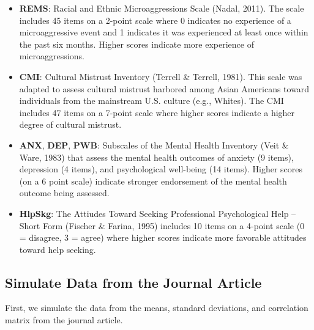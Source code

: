 \documentclass[
  11pt,
]{book}
\providecommand{\tightlist}{%
  \setlength{\itemsep}{0pt}\setlength{\parskip}{0pt}}
\begin{document}
\begin{itemize}
\tightlist
\item
  \textbf{REMS}: Racial and Ethnic Microaggressions Scale (Nadal, 2011). The scale includes 45 items on a 2-point scale where 0 indicates no experience of a microaggressive event and 1 indicates it was experienced at least once within the past six months. Higher scores indicate more experience of microaggressions.
\item
  \textbf{CMI}: Cultural Mistrust Inventory (Terrell \& Terrell, 1981). This scale was adapted to assess cultural mistrust harbored among Asian Americans toward individuals from the mainstream U.S. culture (e.g., Whites). The CMI includes 47 items on a 7-point scale where higher scores indicate a higher degree of cultural mistrust.
\item
  \textbf{ANX}, \textbf{DEP}, \textbf{PWB}: Subscales of the Mental Health Inventory (Veit \& Ware, 1983) that assess the mental health outcomes of anxiety (9 items), depression (4 items), and psychological well-being (14 items). Higher scores (on a 6 point scale) indicate stronger endorsement of the mental health outcome being assessed.
\item
  \textbf{HlpSkg}: The Attiudes Toward Seeking Professional Psychological Help -- Short Form (Fischer \& Farina, 1995) includes 10 items on a 4-point scale (0 = disagree, 3 = agree) where higher scores indicate more favorable attitudes toward help seeking.
\end{itemize}

\hypertarget{simulate-data-from-the-journal-article-1}{%
\subsection{Simulate Data from the Journal Article}\label{simulate-data-from-the-journal-article-1}}

First, we simulate the data from the means, standard deviations, and correlation matrix from the journal article.
\end{document}
